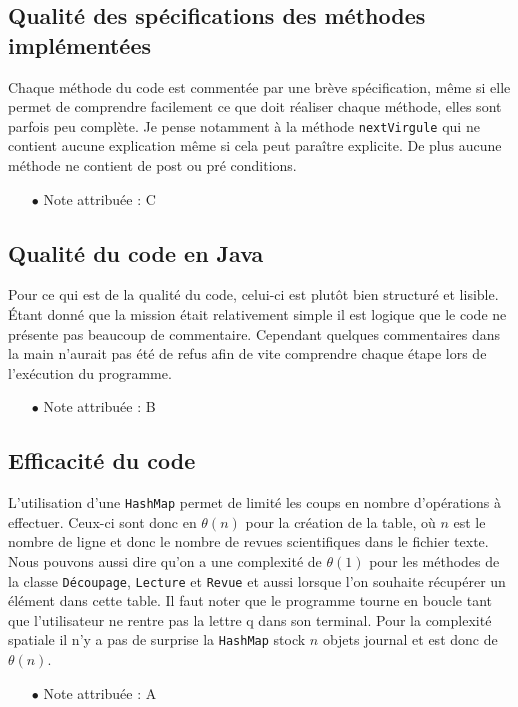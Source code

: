 \documentclass[11pt]{article}
\begin{document}
\subsection{Qualité des spécifications des méthodes implémentées}

Chaque méthode du code est commentée par une brève spécification, même si elle permet de comprendre facilement ce que doit réaliser chaque méthode, elles sont parfois peu complète. Je pense notamment à la méthode \verb+nextVirgule+ qui ne contient aucune explication même si cela peut paraître explicite. De plus aucune méthode ne contient de post ou pré conditions.
\\
\begin{itemize}
\item[$\bullet$] Note attribuée : C
\end{itemize}

\subsection{Qualité du code en Java}

Pour ce qui est de la qualité du code, celui-ci est plutôt bien structuré et lisible. Étant donné que la mission était relativement simple il est logique que le code ne présente pas beaucoup de commentaire. Cependant quelques commentaires dans la main n'aurait pas été de refus afin de vite comprendre chaque étape lors de l'exécution du programme.
\\
\begin{itemize}
\item[$\bullet$] Note attribuée : B
\end{itemize}

\subsection{Efficacité du code}

L'utilisation d'une \verb+HashMap+ permet de limité les coups en nombre d'opérations à effectuer. Ceux-ci sont donc en $\theta(n)$
pour la création de la table, où $n$ est le nombre de ligne et donc le nombre de revues scientifiques dans le fichier texte. Nous pouvons aussi dire qu'on a une complexité de $\theta(1)$ pour les méthodes de la classe \verb+Découpage+, \verb+Lecture+ et \verb+Revue+ et aussi lorsque l'on souhaite récupérer un élément dans cette table. Il faut noter que le programme tourne en boucle tant que l'utilisateur ne rentre pas la lettre q dans son terminal. Pour la complexité spatiale il n'y a pas de surprise la \verb+HashMap+ stock $n$ objets journal et est donc de $\theta(n)$.
\\
\begin{itemize}
\item[$\bullet$] Note attribuée : A
\end{itemize}
\end{document}
